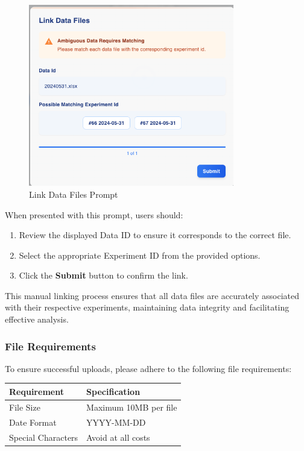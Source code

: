 \documentclass[12pt]{article}
\begin{document}
\begin{figure}[H]
    \centering
    \includegraphics[width=0.8\textwidth]{./Diagrams/DataLinkModal.png}
    \caption{Link Data Files Prompt}
\end{figure}

When presented with this prompt, users should:

\begin{enumerate}
    \item Review the displayed Data ID to ensure it corresponds to the correct
    file.
    \item Select the appropriate Experiment ID from the provided options.
    \item Click the \textbf{Submit} button to confirm the link.
\end{enumerate}

This manual linking process ensures that all data files are accurately
associated with their respective experiments, maintaining data integrity and
facilitating effective analysis.

\subsubsection{File Requirements}
To ensure successful uploads, please adhere to the following file requirements:
\begin{table}[H]
    \centering
    \begin{tabularx}{\textwidth}{lX}
        \toprule
        \textbf{Requirement} & \textbf{Specification} \\
        \midrule
        File Size & Maximum 10MB per file \\
        Date Format & YYYY-MM-DD \\
        Special Characters & Avoid at all costs \\
        \bottomrule
    \end{tabularx}
\end{table}
\end{document}
